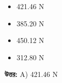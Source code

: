 \documentclass[12pt, a4paper]{article}
\begin{document}
\begin{itemize}[label={}, leftmargin=1cm, itemsep=0.5em]
\item[\textbf{A)}] 421.46 N
\item[\textbf{B)}] 385.20 N
\item[\textbf{C)}] 450.12 N
\item[\textbf{D)}] 312.80 N
\end{itemize}
\vspace{0.5em}

\begin{tcolorbox}[answerbox]
\textbf{\color{success} উত্তর:} A) 421.46 N
\end{tcolorbox}
\vspace{1em}
\end{document}
